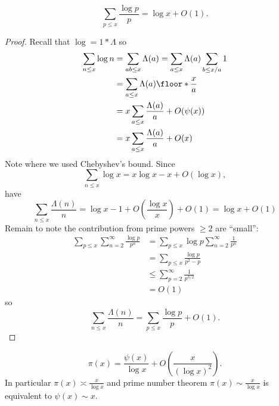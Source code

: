 \documentclass[a4paper]{article}
\begin{document}
\begin{lemma}
  \[
    \sum_{p \leq x} \frac{\log p}{p} = \log x + O(1).
  \]
\end{lemma}

\begin{proof}
  Recall that \(\log = 1 * \Lambda\) so
  \begin{align*}
    \sum_{n \leq x} \log n
    &= \sum_{ab \leq x} \Lambda(a)
    = \sum_{a \leq x} \Lambda(a) \sum_{b \leq x/a} 1 \\
    &= \sum_{a \leq x} \Lambda(a) \floor*{\frac{x}{a}} \\
    &= x \sum_{a \leq x} \frac{\Lambda(a)}{a} + O(\psi(x)) \\
    &= x \sum_{a \leq x} \frac{\Lambda(a)}{a} + O(x) \\
  \end{align*}
  Note where we used Chebyshev's bound. Since
  \[
    \sum_{n \leq x} \log x = x\log x - x + O(\log x),
  \]
  have
  \[
    \sum_{n \leq x} \frac{\Lambda(n)}{n}
    = \log x - 1 + O(\frac{\log x}{x}) + O(1)
    = \log x + O(1)
  \]
  Remain to note the contribution from prime powers \(\geq 2\) are ``small'':
  \begin{align*}
    \sum_{p \leq x} \sum_{n = 2}^\infty \frac{\log p}{p^n}
    &= \sum_{p \leq x} \log p \sum_{n = 2}^\infty \frac{1}{p^n} \\
    &= \sum_{p \leq x} \frac{\log p}{p^2 - p} \\
    &\leq \sum_{p = 2}^\infty \frac{1}{p^{3/2}} \\
    &= O(1)
  \end{align*}
  so
  \[
    \sum_{n \leq x} \frac{\Lambda(n)}{n} = \sum_{p \leq x} \frac{\log p}{p} + O(1).
  \]
\end{proof}

\begin{lemma}
  \[
    \pi(x) = \frac{\psi(x)}{\log x} + O(\frac{x}{(\log x)^2}).
  \]
  In particular \(\pi(x) \asymp \frac{x}{\log x}\) and prime number theorem \(\pi(x) \sim \frac{x}{\log x}\) is equivalent to \(\psi(x) \sim x\).
\end{lemma}
\end{document}
